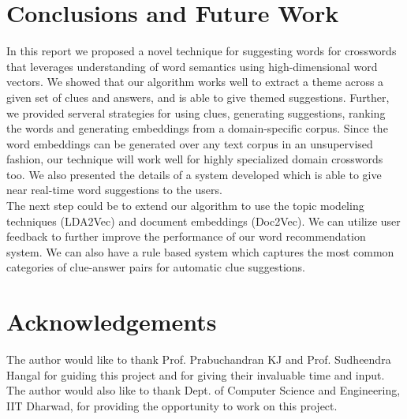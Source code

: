 \documentclass[twoside]{article}
\begin{document}
\section{Conclusions and Future Work}
\label{sec:sec8}
In this report we proposed a novel technique for suggesting words for crosswords that leverages understanding of word semantics using high-dimensional word vectors. We showed that our algorithm works well to extract
a theme across a given set of clues and answers, and is able to give themed suggestions. Further, we provided serveral strategies for using clues, generating suggestions, ranking the words and generating embeddings from a domain-specific corpus. Since the word embeddings can be generated over any text corpus in an unsupervised fashion, our technique will work well for highly specialized domain crosswords too. We also presented the details of a system developed which is able to give near real-time word suggestions to the users.
\\ The next step could be to extend our algorithm to use the topic modeling techniques (LDA2Vec)\cite{cite25} and document embeddings (Doc2Vec)\cite{cite24}. We can utilize user feedback to further improve the performance of our word recommendation system. We can also have a rule based system which captures the most common categories of clue-answer pairs for automatic clue suggestions.


\section{Acknowledgements}
The author would like to thank Prof. Prabuchandran KJ and Prof. Sudheendra Hangal for guiding this project and for giving their invaluable time and input. The author would also like to thank Dept. of Computer Science and Engineering, IIT Dharwad, for providing the opportunity to work on this project.
\end{document}
